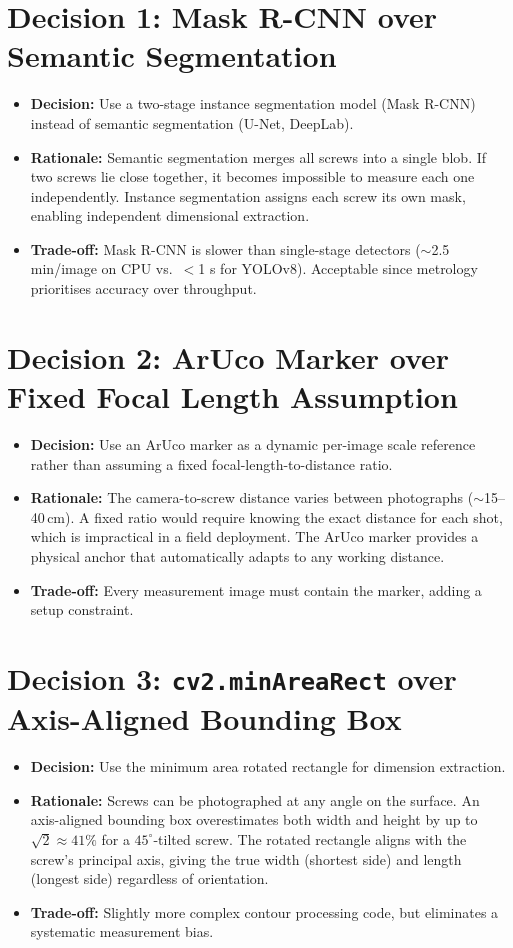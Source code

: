 \documentclass[12pt, a4paper, twoside]{report}
\begin{document}
\section{Decision 1: Mask R-CNN over Semantic Segmentation}
\begin{itemize}
    \item \textbf{Decision:} Use a two-stage instance segmentation model (Mask R-CNN) instead of semantic segmentation (U-Net, DeepLab).
    \item \textbf{Rationale:} Semantic segmentation merges all screws into a single blob. If two screws lie close together, it becomes impossible to measure each one independently. Instance segmentation assigns each screw its own mask, enabling independent dimensional extraction.
    \item \textbf{Trade-off:} Mask R-CNN is slower than single-stage detectors ($\sim$2.5 min/image on CPU vs.\ $<$1 s for YOLOv8). Acceptable since metrology prioritises accuracy over throughput.
\end{itemize}

\section{Decision 2: ArUco Marker over Fixed Focal Length Assumption}
\begin{itemize}
    \item \textbf{Decision:} Use an ArUco marker as a dynamic per-image scale reference rather than assuming a fixed focal-length-to-distance ratio.
    \item \textbf{Rationale:} The camera-to-screw distance varies between photographs ($\sim$15--40\,cm). A fixed ratio would require knowing the exact distance for each shot, which is impractical in a field deployment. The ArUco marker provides a physical anchor that automatically adapts to any working distance.
    \item \textbf{Trade-off:} Every measurement image must contain the marker, adding a setup constraint.
\end{itemize}

\section{Decision 3: \texttt{cv2.minAreaRect} over Axis-Aligned Bounding Box}
\begin{itemize}
    \item \textbf{Decision:} Use the minimum area rotated rectangle for dimension extraction.
    \item \textbf{Rationale:} Screws can be photographed at any angle on the surface. An axis-aligned bounding box overestimates both width and height by up to $\sqrt{2} \approx 41\%$ for a $45^\circ$-tilted screw. The rotated rectangle aligns with the screw's principal axis, giving the true width (shortest side) and length (longest side) regardless of orientation.
    \item \textbf{Trade-off:} Slightly more complex contour processing code, but eliminates a systematic measurement bias.
\end{itemize}
\end{document}
